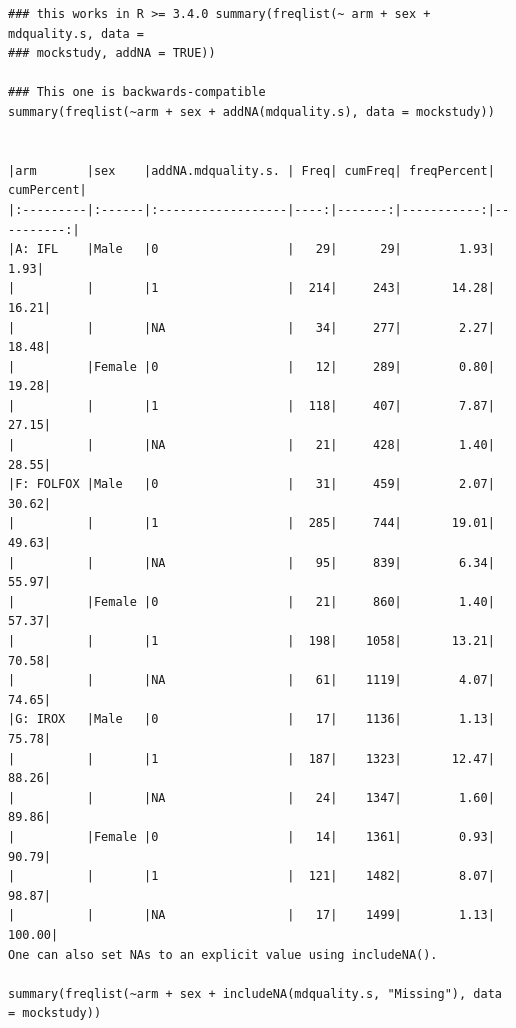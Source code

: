 \documentclass[
]{book}
\begin{document}
\begin{verbatim}
### this works in R >= 3.4.0 summary(freqlist(~ arm + sex + mdquality.s, data =
### mockstudy, addNA = TRUE))

### This one is backwards-compatible
summary(freqlist(~arm + sex + addNA(mdquality.s), data = mockstudy))


|arm       |sex    |addNA.mdquality.s. | Freq| cumFreq| freqPercent| cumPercent|
|:---------|:------|:------------------|----:|-------:|-----------:|----------:|
|A: IFL    |Male   |0                  |   29|      29|        1.93|       1.93|
|          |       |1                  |  214|     243|       14.28|      16.21|
|          |       |NA                 |   34|     277|        2.27|      18.48|
|          |Female |0                  |   12|     289|        0.80|      19.28|
|          |       |1                  |  118|     407|        7.87|      27.15|
|          |       |NA                 |   21|     428|        1.40|      28.55|
|F: FOLFOX |Male   |0                  |   31|     459|        2.07|      30.62|
|          |       |1                  |  285|     744|       19.01|      49.63|
|          |       |NA                 |   95|     839|        6.34|      55.97|
|          |Female |0                  |   21|     860|        1.40|      57.37|
|          |       |1                  |  198|    1058|       13.21|      70.58|
|          |       |NA                 |   61|    1119|        4.07|      74.65|
|G: IROX   |Male   |0                  |   17|    1136|        1.13|      75.78|
|          |       |1                  |  187|    1323|       12.47|      88.26|
|          |       |NA                 |   24|    1347|        1.60|      89.86|
|          |Female |0                  |   14|    1361|        0.93|      90.79|
|          |       |1                  |  121|    1482|        8.07|      98.87|
|          |       |NA                 |   17|    1499|        1.13|     100.00|
One can also set NAs to an explicit value using includeNA().

summary(freqlist(~arm + sex + includeNA(mdquality.s, "Missing"), data = mockstudy))



\end{verbatim}
\end{document}
